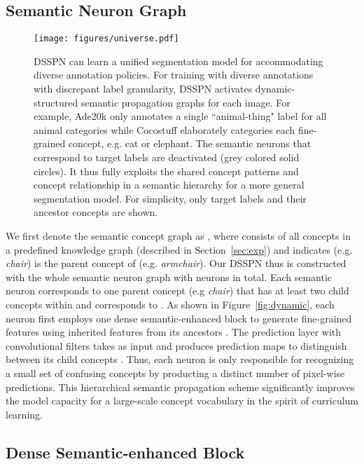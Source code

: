 \documentclass[10pt,twocolumn,letterpaper]{article}
\begin{document}
\subsection{Semantic Neuron Graph} 

\begin{figure*}[!tp]
		\begin{center}
			\texttt{[image: figures/universe.pdf]}
			\caption{DSSPN can learn a unified segmentation model for accommodating diverse annotation policies. For training with diverse annotations with discrepant label granularity, DSSPN activates dynamic-structured semantic propagation graphs for each image. For example, Ade20k only annotates a single ``animal-thing" label for all animal categories while Cocostuff elaborately categories each fine-grained concept, e.g. cat or elephant. The semantic neurons that correspond to target labels are deactivated (grey colored solid circles). It thus fully exploits the shared concept patterns and concept relationship in a semantic hierarchy for a more general segmentation model. For simplicity, only target labels and their ancestor concepts are shown.}
			\label{fig:universal}
		\end{center}
		\vspace{-6mm}
	\end{figure*}
	
We first denote the semantic concept graph as , where  consists of all concepts  in a predefined knowledge graph (described in Section~\ref{sec:exp}) and  indicates  (e.g. \emph{chair}) is the parent concept of  (e.g. \emph{armchair}). Our DSSPN thus is constructed with the whole semantic neuron graph  with  neurons in total. Each semantic neuron  corresponds to one parent concept (e.g \emph{chair}) that has at least two child concepts within  and  corresponds to . As shown in Figure~\ref{fig:dynamic}, each neuron  first employs one dense semantic-enhanced block to generate fine-grained features  using inherited features from its ancestors . The prediction layer  with  convolutional filters takes  as input and produces  prediction maps to distinguish between its  child concepts . Thus, each neuron is only responsible for recognizing a small set of confusing concepts by producting a distinct number of pixel-wise predictions. This hierarchical semantic propagation scheme significantly improves the model capacity for a large-scale concept vocabulary in the spirit of curriculum learning.


	
\subsection{Dense Semantic-enhanced Block}
\end{document}
